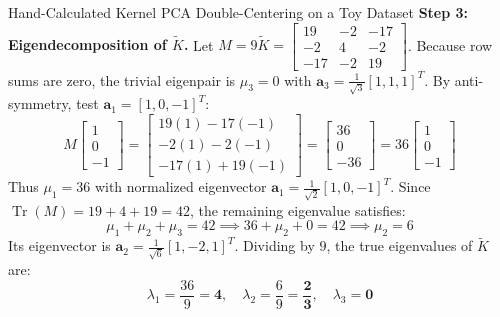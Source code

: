 \begin{examplebox}{Hand-Calculated Kernel PCA Double-Centering on a Toy Dataset}
\textbf{Step 3: Eigendecomposition of $\tilde{K}$.}
Let $M = 9\tilde{K} = \begin{bmatrix} 19 & -2 & -17 \\ -2 & 4 & -2 \\ -17 & -2 & 19 \end{bmatrix}$. 
Because row sums are zero, the trivial eigenpair is $\mu_3 = 0$ with $\mathbf{a}_3 = \frac{1}{\sqrt{3}}[1, 1, 1]^T$.
By anti-symmetry, test $\mathbf{a}_1 = [1, 0, -1]^T$:
\begin{equation}
M \begin{bmatrix} 1 \\ 0 \\ -1 \end{bmatrix} = \begin{bmatrix} 19(1) - 17(-1) \\ -2(1) - 2(-1) \\ -17(1) + 19(-1) \end{bmatrix} = \begin{bmatrix} 36 \\ 0 \\ -36 \end{bmatrix} = 36 \begin{bmatrix} 1 \\ 0 \\ -1 \end{bmatrix}
\end{equation}
Thus $\mu_1 = 36$ with normalized eigenvector $\mathbf{a}_1 = \frac{1}{\sqrt{2}}[1, 0, -1]^T$.
Since $\operatorname{Tr}(M) = 19 + 4 + 19 = 42$, the remaining eigenvalue satisfies:
\begin{equation}
\mu_1 + \mu_2 + \mu_3 = 42 \implies 36 + \mu_2 + 0 = 42 \implies \mu_2 = 6
\end{equation}
Its eigenvector is $\mathbf{a}_2 = \frac{1}{\sqrt{6}}[1, -2, 1]^T$.
Dividing by $9$, the true eigenvalues of $\tilde{K}$ are:
\begin{equation}
\lambda_1 = \frac{36}{9} = \mathbf{4}, \quad \lambda_2 = \frac{6}{9} = \frac{\mathbf{2}}{\mathbf{3}}, \quad \lambda_3 = \mathbf{0}
\end{equation}


\end{examplebox}
